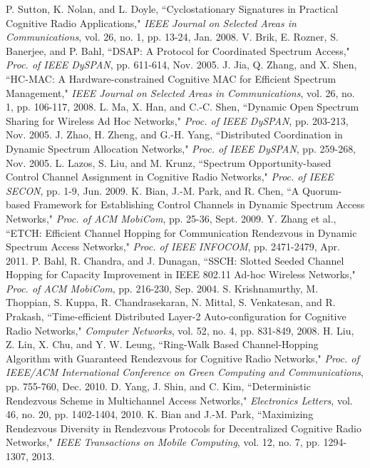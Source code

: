 \documentclass[journal]{IEEEtran}
\begin{document}
\begin{thebibliography}{1}
P. Sutton, K. Nolan, and L. Doyle, ``Cyclostationary Signatures in Practical Cognitive Radio Applications," \emph{IEEE Journal on Selected Areas in Communications}, vol. 26, no. 1, pp. 13-24, Jan. 2008.
V. Brik, E. Rozner, S. Banerjee, and P. Bahl, ``DSAP: A Protocol for Coordinated Spectrum Access," \emph{Proc. of IEEE DySPAN}, pp. 611-614, Nov. 2005.
J. Jia, Q. Zhang, and X. Shen, ``HC-MAC: A Hardware-constrained Cognitive MAC for Efficient Spectrum Management," \emph{IEEE Journal on Selected Areas in Communications}, vol. 26, no. 1, pp. 106-117, 2008.
L. Ma, X. Han, and C.-C. Shen, ``Dynamic Open Spectrum Sharing for Wireless Ad Hoc Networks," \emph{Proc. of IEEE DySPAN}, pp. 203-213, Nov. 2005.
J. Zhao, H. Zheng, and G.-H. Yang, ``Distributed Coordination in Dynamic Spectrum Allocation Networks," \emph{Proc. of IEEE DySPAN}, pp. 259-268, Nov. 2005.
L. Lazos, S. Liu, and M. Krunz, ``Spectrum Opportunity-based Control Channel Assignment in Cognitive Radio Networks," \emph{Proc. of IEEE SECON}, pp. 1-9, Jun. 2009.
K. Bian, J.-M. Park, and R. Chen, ``A Quorum-based Framework for Establishing Control Channels in Dynamic Spectrum Access Networks," \emph{Proc. of ACM MobiCom}, pp. 25-36, Sept. 2009.
Y. Zhang et al., ``ETCH: Efficient Channel Hopping for Communication Rendezvous in Dynamic Spectrum Access Networks," \emph{Proc. of IEEE INFOCOM}, pp. 2471-2479, Apr. 2011.
P. Bahl, R. Chandra, and J. Dunagan, ``SSCH: Slotted Seeded Channel Hopping for Capacity Improvement in IEEE 802.11 Ad-hoc Wireless Networks," \emph{Proc. of ACM MobiCom}, pp. 216-230, Sep. 2004.
S. Krishnamurthy, M. Thoppian, S. Kuppa, R. Chandrasekaran, N. Mittal, S. Venkatesan, and R. Prakash, ``Time-efficient Distributed Layer-2 Auto-configuration for Cognitive Radio Networks," \emph{Computer Networks}, vol. 52, no. 4, pp. 831-849, 2008.
H. Liu,  Z. Lin,  X. Chu, and Y. W. Leung, ``Ring-Walk Based Channel-Hopping Algorithm with Guaranteed Rendezvous for Cognitive Radio Networks," \emph{Proc. of IEEE/ACM International Conference on Green Computing and Communications}, pp. 755-760, Dec. 2010.
D. Yang, J. Shin, and C. Kim, ``Deterministic Rendezvous Scheme in Multichannel Access Networks," \emph{Electronics Letters}, vol. 46, no. 20, pp. 1402-1404, 2010.
K. Bian and J.-M. Park, ``Maximizing Rendezvous Diversity in Rendezvous Protocols for Decentralized Cognitive Radio Networks," \emph{IEEE Transactions on Mobile Computing}, vol. 12, no. 7, pp. 1294-1307, 2013.

\end{thebibliography}
\end{document}
